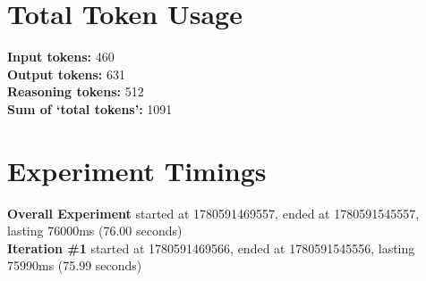 \documentclass{article}
\begin{document}
\section*{Total Token Usage}
\textbf{Input tokens: }460
\\\textbf{Output tokens: }631
\\\textbf{Reasoning tokens: }512
\\\textbf{Sum of `total tokens': }1091
\section*{Experiment Timings}
\textbf{Overall Experiment} started at 1780591469557, ended at 1780591545557, lasting 76000ms (76.00 seconds)
\\\textbf{Iteration \#1} started at 1780591469566, ended at 1780591545556, lasting 75990ms (75.99 seconds)
\end{document}
